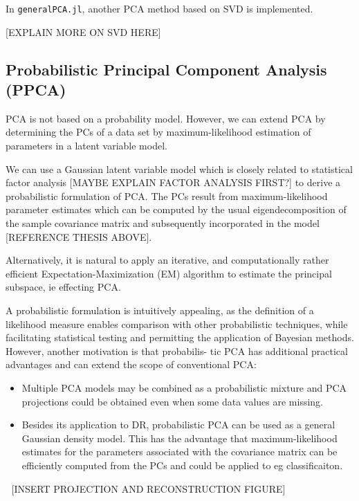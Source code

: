 \documentclass[journal, a4paper]{IEEEtran}
\begin{document}
In \texttt{generalPCA.jl}, another PCA method based on SVD is implemented.



[EXPLAIN MORE ON SVD HERE]


\subsection{Probabilistic Principal Component Analysis (PPCA)}

PCA is not based on a probability model. However, we can extend PCA by determining the PCs of a data set by maximum-likelihood estimation of parameters in a latent variable model.

We can use a Gaussian latent variable model which is closely related to statistical factor analysis  [MAYBE EXPLAIN FACTOR ANALYSIS FIRST?] to derive a probabilistic formulation of PCA. The PCs result from maximum-likelihood parameter estimates which can be computed by the usual eigendecomposition of the sample covariance matrix and subsequently incorporated in the model [REFERENCE THESIS ABOVE]. 


Alternatively, it is natural to apply an iterative, and computationally rather efficient Expectation-Maximization (EM) algorithm to estimate the principal subspace, ie effecting PCA.


A probabilistic formulation is intuitively appealing, as the definition of a likelihood measure
enables comparison with other probabilistic techniques, while facilitating statistical testing and
permitting the application of Bayesian methods. However, another motivation is that probabilis-
tic PCA has additional practical advantages and can extend the scope of conventional PCA:
\begin{itemize}
	\item  Multiple PCA models may be combined as a probabilistic mixture and PCA projections could be obtained even when some data values are missing.
	\item Besides its application to DR, probabilistic PCA can be used as a general Gaussian density model. This has the advantage that maximum-likelihood estimates for the parameters associated with the covariance matrix can be efficiently computed from the PCs and could be applied to eg classificaiton. 
\end{itemize}

[INSERT PROJECTION AND RECONSTRUCTION FIGURE]
\end{document}
